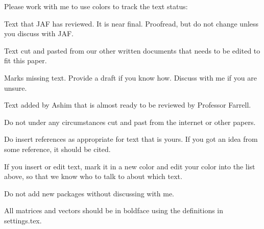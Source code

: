 Please work with me to use colors to track the text status:
\begin{description}
	{\color{blue}\item[Blue text] Text that JAF has reviewed. It is near final. Proofread, but do not change unless you discuss with JAF.}
	{\color{black}\item[Black text] Text cut and pasted from our other written documents that needs to be edited to fit this paper.}
	{\color{green}\item[Green text] Marks missing text. Provide a draft if you know how. Discuss with me if you are unsure.}
	{\color{magenta}\item[Magenta text] Text added by Ashim that is almost ready to be reviewed by Professor Farrell.}
	
\end{description}
Do not under any circumstances cut and past from the internet or other papers.

Do insert references as appropriate for text that is yours. If you got an idea from some reference, it should be cited.

If you insert or edit text, mark it in a new color and edit your color into the list above, so that we know who to talk to about which text.

Do not add new packages without discussing with me.  

All matrices and vectors should be in boldface using the definitions in settings.tex.
